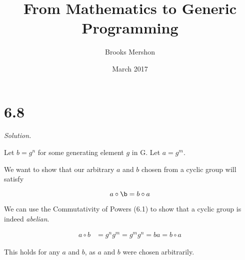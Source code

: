 \documentclass{article}
\title{From Mathematics to Generic Programming}
\author{Brooks Mershon}
\date{March 2017}
\begin{document}
\maketitle

\section*{6.8}

\textit{Solution.}

Let $b = g^n$ for some generating element $g$ in G. Let $a = g^m$.

We want to show that our arbitrary $a$ and $b$ chosen from a cyclic group will satisfy

$$a \circ \b = b \circ a$$

We can use the Commutativity of Powers (6.1) to show that a cyclic group is indeed \textit{abelian}.

\begin{align*}
    a \circ b &= g^n g^m = g^m g^n = b a = b \circ a
\end{align*}

This holds for any $a$ and $b$, as $a$ and $b$ were chosen arbitrarily.
\end{document}
